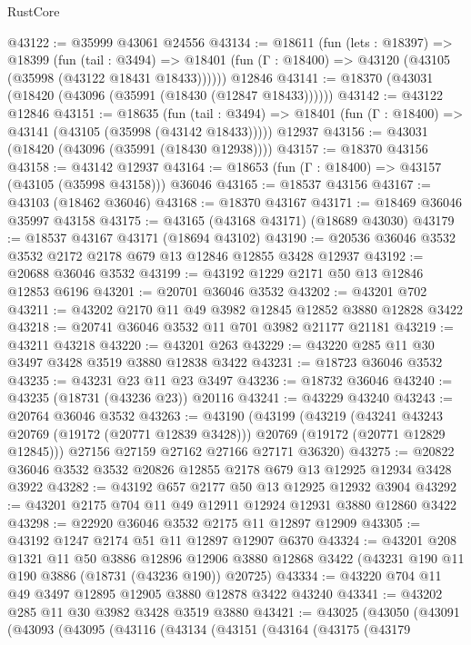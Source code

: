 \begin{lexlean}{RustCore}
\begin{coremodule}
@43122 := @35999 @43061 @24556
@43134 := @18611
    (fun (lets : @18397) =>
    @18399
      (fun (tail : @3494) =>
      @18401 (fun (Γ : @18400) => @43120 (@43105 (@35998 (@43122 @18431 @18433))))))
    @12846
@43141 := @18370 (@43031 (@18420 (@43096 (@35991 (@18430 (@12847 @18433))))))
@43142 := @43122 @12846
@43151 := @18635
    (fun (tail : @3494) => @18401 (fun (Γ : @18400) => @43141 (@43105 (@35998 (@43142 @18433)))))
    @12937
@43156 := @43031 (@18420 (@43096 (@35991 (@18430 @12938))))
@43157 := @18370 @43156
@43158 := @43142 @12937
@43164 := @18653 (fun (Γ : @18400) => @43157 (@43105 (@35998 @43158))) @36046
@43165 := @18537 @43156
@43167 := @43103 (@18462 @36046)
@43168 := @18370 @43167
@43171 := @18469 @36046 @35997 @43158
@43175 := @43165 (@43168 @43171) (@18689 @43030)
@43179 := @18537 @43167 @43171 (@18694 @43102)
@43190 := @20536 @36046 @3532 @3532 @2172 @2178 @679 @13 @12846 @12855 @3428 @12937
@43192 := @20688 @36046 @3532
@43199 := @43192 @1229 @2171 @50 @13 @12846 @12853 @6196
@43201 := @20701 @36046 @3532
@43202 := @43201 @702
@43211 := @43202 @2170 @11 @49 @3982 @12845 @12852 @3880 @12828 @3422
@43218 := @20741 @36046 @3532 @11 @701 @3982 @21177 @21181
@43219 := @43211 @43218
@43220 := @43201 @263
@43229 := @43220 @285 @11 @30 @3497 @3428 @3519 @3880 @12838 @3422
@43231 := @18723 @36046 @3532
@43235 := @43231 @23 @11 @23 @3497
@43236 := @18732 @36046
@43240 := @43235 (@18731 (@43236 @23)) @20116
@43241 := @43229 @43240
@43243 := @20764 @36046 @3532
@43263 := @43190
    (@43199
      (@43219
        (@43241 @43243 @20769 (@19172 (@20771 @12839 @3428)))
        @20769
        (@19172 (@20771 @12829 @12845)))
      @27156
      @27159
      @27162
      @27166
      @27171
      @36320)
@43275 := @20822 @36046 @3532 @3532 @20826 @12855 @2178 @679 @13 @12925 @12934 @3428 @3922
@43282 := @43192 @657 @2177 @50 @13 @12925 @12932 @3904
@43292 := @43201 @2175 @704 @11 @49 @12911 @12924 @12931 @3880 @12860 @3422
@43298 := @22920 @36046 @3532 @2175 @11 @12897 @12909
@43305 := @43192 @1247 @2174 @51 @11 @12897 @12907 @6370
@43324 := @43201
    @208
    @1321
    @11
    @50
    @3886
    @12896
    @12906
    @3880
    @12868
    @3422
    (@43231 @190 @11 @190 @3886 (@18731 (@43236 @190)) @20725)
@43334 := @43220 @704 @11 @49 @3497 @12895 @12905 @3880 @12878 @3422 @43240
@43341 := @43202 @285 @11 @30 @3982 @3428 @3519 @3880
@43421 := @43025
    (@43050
      (@43091
        (@43093
          (@43095
            (@43116
              (@43134
                (@43151
                  (@43164
                    (@43175
                      (@43179

\end{coremodule}
\end{lexlean}
